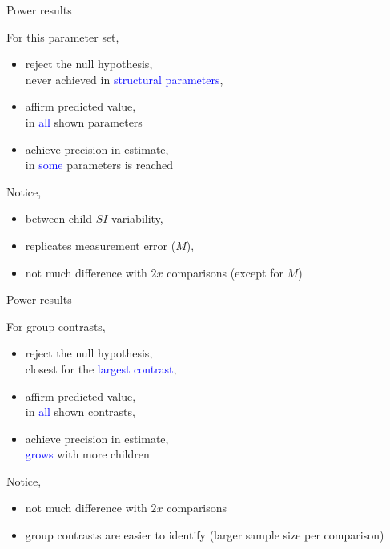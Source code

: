 %
%
\begin{lhframe}[rhgraphic={\texttt{[image: power\_result1.pdf]}}]
	{Power results} 
	
	For this parameter set,
	\begin{itemize}
		\item reject the null hypothesis, \\
		never achieved in \textcolor{blue}{structural parameters},
		\item affirm predicted value, \\
		in \textcolor{blue}{all} shown parameters
		\item achieve precision in estimate, \\
		in \textcolor{blue}{some} parameters is reached
	\end{itemize}
	
	Notice,
	\begin{itemize}
		\item between child $SI$ variability,
		\item replicates measurement error ($M$),
		\item not much difference with $2x$ comparisons {\small(except for $M$)}
	\end{itemize}
\end{lhframe}
%
%
\begin{lhframe}[rhgraphic={\texttt{[image: power\_result2.pdf]}}]
	{Power results} 
	
	For group contrasts,
	\begin{itemize}
		\item reject the null hypothesis, \\
		closest for the \textcolor{blue}{largest contrast},
		\item affirm predicted value, \\
		in \textcolor{blue}{all} shown contrasts,
		\item achieve precision in estimate, \\
		\textcolor{blue}{grows} with more children
	\end{itemize}
	
	Notice,
	\begin{itemize}
		\item not much difference with $2x$ comparisons
		\item group contrasts are easier to identify {\small (larger sample size per comparison) }
	\end{itemize}
\end{lhframe}
